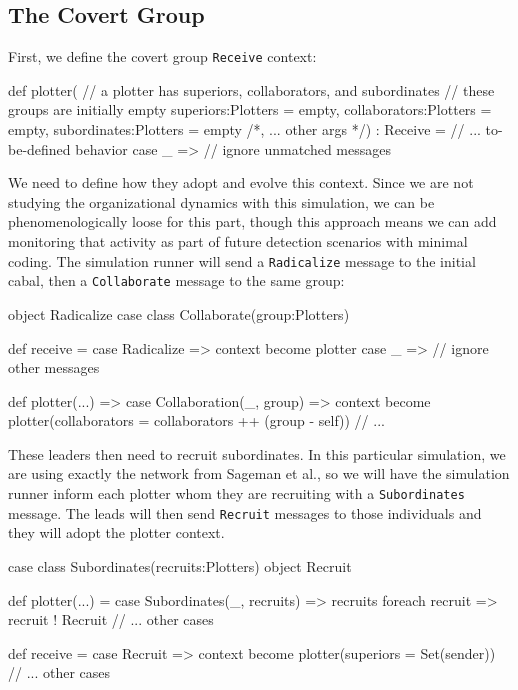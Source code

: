 \documentclass{article}
\begin{document}
\subsection*{The Covert Group}
First, we define the covert group \texttt{Receive} context:

\begin{code}
  def plotter(
    // a plotter has superiors, collaborators, and subordinates
    // these groups are initially empty
    superiors:Plotters = empty,
    collaborators:Plotters = empty,
    subordinates:Plotters = empty
    /*, ... other args */) : Receive = {
      // ... to-be-defined behavior
      case _ => // ignore unmatched messages
  }
\end{code}

We need to define how they adopt and evolve this context.  Since we are not studying the organizational dynamics with this simulation, we can be phenomenologically loose for this part, though this approach means we can add monitoring that activity as part of future detection scenarios with minimal coding.  The simulation runner will send a \texttt{Radicalize} message to the initial cabal, then a \texttt{Collaborate} message to the same group:

\begin{code}
  object Radicalize
  case class Collaborate(group:Plotters)

  def receive = {
    case Radicalize =>
      context become plotter
    case _ => // ignore other messages
  }
  
  def plotter(...) => {
    case Collaboration(_, group) =>
      context become plotter(collaborators = collaborators ++ (group - self))
    // ...
  }
\end{code}

These leaders then need to recruit subordinates.  In this particular simulation, we are using exactly the network from Sageman et al., so we will have the simulation runner inform each plotter whom they are recruiting with a \texttt{Subordinates} message.  The leads will then send \texttt{Recruit} messages to those individuals and they will adopt the plotter context.

\begin{code}
  case class Subordinates(recruits:Plotters)
  object Recruit

  def plotter(...) = {
    case Subordinates(_, recruits) =>
      recruits foreach { recruit =>
        recruit ! Recruit
      }
    // ... other cases
  }
  
  def receive = {
    case Recruit =>
      context become plotter(superiors = Set(sender))
    // ... other cases
  }
\end{code}
\end{document}
